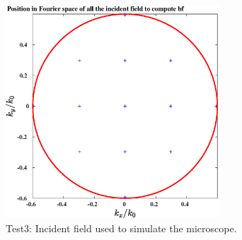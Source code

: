 \begin{figure}[H]
\begin{center}
  \includegraphics*[width=8.0cm,draft=false]{test3angleincbf.eps}
\end{center}
\caption{Test3: Incident field used to simulate the microscope.}
\end{figure}

